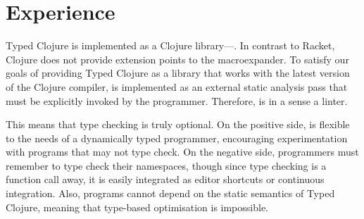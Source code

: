 \section{Experience}
\label{sec:experience}

Typed Clojure is implemented as a Clojure library---\coretyped{}.
In contrast to Racket, Clojure does not provide extension
points to the macroexpander. To satisfy our goals of providing
Typed Clojure as a library that works with the latest version of the Clojure
compiler, \coretyped{} is implemented as an external static analysis pass
that must be explicitly invoked by the programmer.
Therefore, \coretyped{} is in a sense a linter.

This means that type checking is truly optional. 
On the positive side, \coretyped{} is flexible to the needs of a dynamically
typed programmer, encouraging experimentation with programs that may not
type check.
On the negative side, programmers must remember to type check their namespaces,
though since type checking is a function call away, it is easily integrated as editor
shortcuts or continuous integration.
Also, programs cannot depend on the static semantics of Typed Clojure, meaning that
type-based optimisation is impossible. 

%
%

